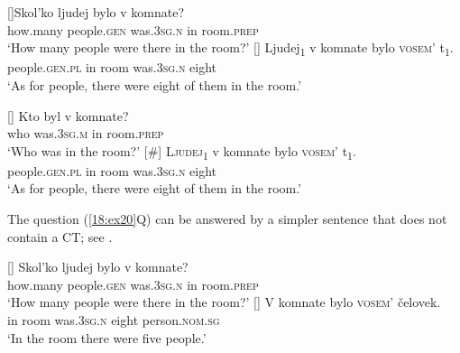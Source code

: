 \documentclass[output=paper,
modfonts,
newtxmath,
hidelinks
]{langscibook}
\begin{document}
\begin{exe} 
\ex \label{18:ex20}
\begin{xlist}
[]{\gll Skol’ko ljudej bylo v komnate?\\
how.many people.\textsc{gen} was.\textsc{3sg.n} in room.\textsc{prep}\\
	\glt `How many people were there in the room?'
    }
[]{ 
	\gll Ljudej\textsubscript{1}    v   komnate  bylo     \textsc{vosem’}   t\textsubscript{1}.\\
		 people.\textsc{gen.pl} in   room    was.\textsc{3sg.n}  eight  \\
	\glt `As for people, there were eight of them in the room.'
    }
\end{xlist}
\end{exe}

\begin{exe}
\ex \label{18:ex21}
\begin{xlist}
[]{
	\gll 
    	 Kto byl v komnate?\\
         who was.\textsc{3sg.m} in room.\textsc{prep}\\
	\glt `Who was in the room?'
    }
[\#]{
	\gll \textsc{Ljudej\textsubscript{1}}  v   komnate  bylo     \textsc{vosem’}   t\textsubscript{1}.\\
		 people.\textsc{gen.pl} in   room    was.\textsc{3sg.n}  eight  \\
    	\glt `As for people, there were eight of them in the room.'
        }
\end{xlist}
\end{exe}

\noindent The question (\ref{18:ex20}Q) can be answered by a simpler sentence that does not contain a CT; see .

\begin{exe}
\ex \label{18:ex22}
\begin{xlist}
[]{
	\gll 
    	 Skol’ko ljudej bylo v komnate?\\
         how.many people.\textsc{gen} was.\textsc{3sg.n} in room.\textsc{prep}\\
	\glt `How many people were there in the room?'
    }
[]{
	\gll V  komnate  bylo    \textsc{vosem’}    čelovek.\\
		 in  room    was.\textsc{3sg.n}  eight     person.\textsc{nom.sg}\\
    \glt `In the room there were five people.'     
    }
\end{xlist}
\end{exe}
\end{document}
